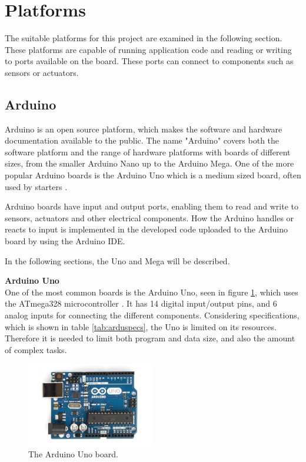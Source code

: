 \section{Platforms}
The suitable platforms for this project are examined in the following section. These platforms are capable of running application code and reading or writing to ports available on the board. These ports can connect to components such as sensors or actuators.

\subsection{Arduino}\label{sec:arduino}
Arduino is an open source platform, which makes the software and hardware documentation available to the public. The name "Arduino" covers both the software platform and the range of hardware platforms with boards of different sizes, from the smaller Arduino Nano up to the Arduino Mega. One of the more popular Arduino boards is the Arduino Uno which is a medium sized board, often used by starters \cite{arduinouno}.

Arduino boards have input and output ports, enabling them to read and write to sensors, actuators and other electrical components. How the Arduino handles or reacts to input is implemented in the developed code uploaded to the Arduino board by using the Arduino IDE.

In the following sections, the Uno and Mega will be described.

\textbf{Arduino Uno}\\
One of the most common boards is the Arduino Uno, seen in figure \ref{fig:arduinouno}, which uses the ATmega328 microcontroller \cite{arduinouno}. It has 14 digital input/output pins, and 6 analog inputs for connecting the different components. Considering specifications, which is shown in table \ref{tab:arduspecs}, the Uno is limited on its resources. Therefore it is needed to limit both program and data size, and also the amount of complex tasks.

\begin{figure}[h!]
\centering
\includegraphics[width=0.5\textwidth]{chapters/analysis/figs/ArduinoUno.jpg}
\caption{The Arduino Uno board\cite{arduinointroduction}.}
\label{fig:arduinouno}
\end{figure}

